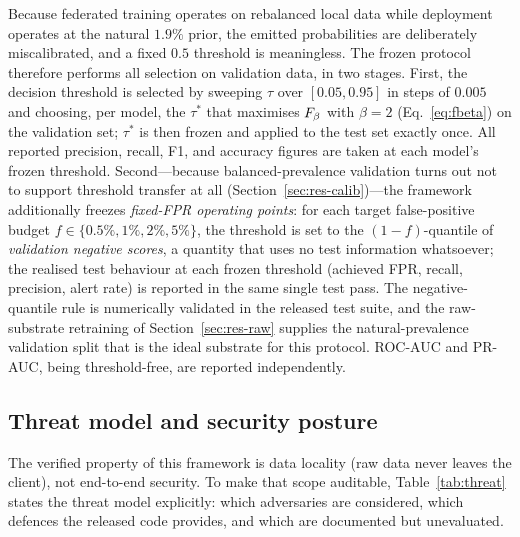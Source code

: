Because federated training operates on rebalanced local data while
deployment operates at the natural $1.9\%$ prior, the emitted
probabilities are deliberately miscalibrated, and a fixed $0.5$
threshold is meaningless. The frozen protocol therefore performs all
selection on validation data, in two stages. First, the decision
threshold is selected by sweeping $\tau$ over $[0.05, 0.95]$ in steps
of $0.005$ and choosing, per model, the $\tau^\ast$ that maximises
$F_{\beta}$ with $\beta=2$ (Eq.~\eqref{eq:fbeta}) on the validation set;
$\tau^\ast$ is then frozen and applied to the test set exactly once.
All reported precision, recall, F1, and accuracy figures are taken at
each model's frozen threshold. Second---because balanced-prevalence
validation turns out not to support threshold transfer at all
(Section~\ref{sec:res-calib})---the framework additionally freezes
\emph{fixed-FPR operating points}: for each target false-positive
budget $f \in \{0.5\%, 1\%, 2\%, 5\%\}$, the threshold is set to the
$(1-f)$-quantile of \emph{validation negative scores}, a quantity that
uses no test information whatsoever; the realised test behaviour at
each frozen threshold (achieved FPR, recall, precision, alert rate) is
reported in the same single test pass. The negative-quantile rule is
numerically validated in the released test suite, and the
raw-substrate retraining of Section~\ref{sec:res-raw} supplies the
natural-prevalence validation split that is the ideal substrate for
this protocol.
ROC-AUC and PR-AUC, being threshold-free, are reported independently.

\subsection{Threat model and security posture}
\label{sec:threatmodel}

The verified property of this framework is data locality (raw data
never leaves the client), not end-to-end security. To make that scope
auditable, Table~\ref{tab:threat} states the threat model explicitly:
which adversaries are considered, which defences the released code
provides, and which are documented but unevaluated.

